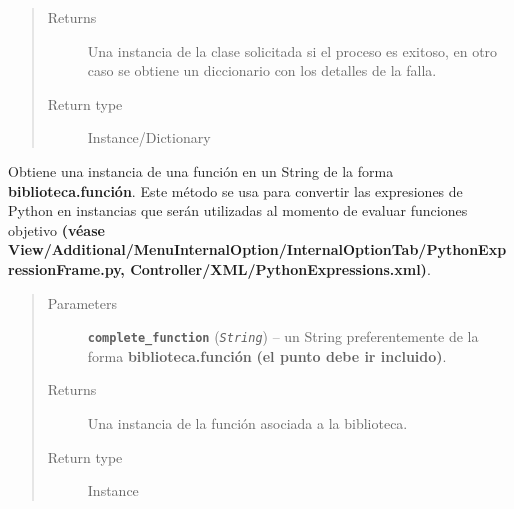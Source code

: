 \documentclass[letterpaper,10pt,english]{sphinxmanual}
\begin{document}
\begin{fulllineitems}
\begin{fulllineitems}
\begin{quote}
\begin{description}
\item[{Returns}] \leavevmode
Una instancia de la clase solicitada si el proceso es exitoso,
en otro caso se obtiene un diccionario con los detalles de la
falla.

\item[{Return type}] \leavevmode
Instance/Dictionary

\end{description}\end{quote}

\end{fulllineitems}


\begin{fulllineitems}
\label{Controller/Verifier:Controller.Verifier.Verifier.get_dynamic_function}
Obtiene una instancia de una función en un String 
de la forma \textbf{biblioteca.función}.
Este método se usa para convertir las expresiones de Python
en instancias que serán utilizadas al momento de evaluar  
funciones objetivo \textbf{(véase View/Additional/MenuInternalOption/InternalOptionTab/PythonExpressionFrame.py,
Controller/XML/PythonExpressions.xml)}.
\begin{quote}\begin{description}
\item[{Parameters}] \leavevmode
\textbf{\texttt{complete\_function}} (\emph{\texttt{String}}) -- un String preferentemente de la forma
\textbf{biblioteca.función} \textbf{(el punto debe ir incluido)}.

\item[{Returns}] \leavevmode
Una instancia de la función asociada a la biblioteca.

\item[{Return type}] \leavevmode
Instance

\end{description}\end{quote}

\end{fulllineitems}



\end{fulllineitems}
\end{document}
